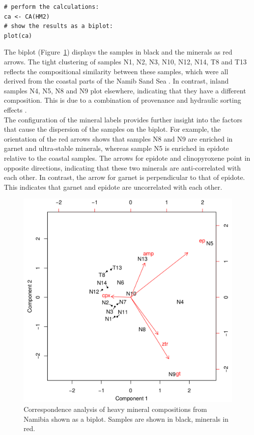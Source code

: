 \documentclass{article}
\begin{document}
\begin{verbatim}
# perform the calculations:
ca <- CA(HM2)
# show the results as a biplot:
plot(ca)
\end{verbatim}

The biplot (Figure~\ref{fig:CA}) displays the samples in black and the
minerals as red arrows. The tight clustering of samples N1, N2, N3,
N10, N12, N14, T8 and T13 reflects the compositional similarity
between these samples, which were all derived from the coastal parts
of the Namib Sand Sea \citep{vermeesch2015}.  In contrast, inland
samples N4, N5, N8 and N9 plot elsewhere, indicating that they have a
different composition. This is due to a combination of provenance and
hydraulic sorting effects \citep{vermeesch2015}.\\

The configuration of the mineral labels provides further insight into
the factors that cause the dispersion of the samples on the
biplot. For example, the orientation of the red arrows shows that
samples N8 and N9 are enriched in garnet and ultra-stable minerals,
whereas sample N5 is enriched in epidote relative to the coastal
samples.  The arrows for epidote and clinopyroxene point in opposite
directions, indicating that these two minerals are anti-correlated
with each other. In contrast, the arrow for garnet is perpendicular to
that of epidote. This indicates that garnet and epidote are
uncorrelated with each other.

\begin{figure}[!ht]
  \centering
  \includegraphics[width=.7\textwidth]{CA.png}
  \caption{Correspondence analysis of heavy mineral compositions from
    Namibia \citep{vermeesch2016a} shown as a biplot.  Samples are
    shown in black, minerals in red.}
  \label{fig:CA}
\end{figure}
\end{document}
